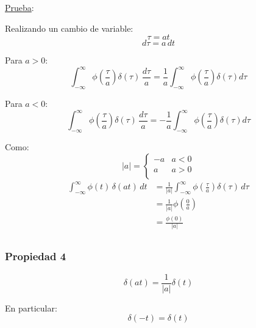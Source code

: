 \underline{Prueba}:

Realizando un cambio de variable:
\begin{equation*}
    \tau=at
\end{equation*}
\begin{equation*}
    d\tau=a\,dt
\end{equation*}

Para $a>0$:
\begin{equation*}
    \int_{-\infty}^{\infty}
        \phi\left(\frac{\tau}{a}\right)\delta(\tau)\,\frac{d\tau}{a}
        =\frac{1}{a}\int_{-\infty}^{\infty}
            \phi\left(\frac{\tau}{a}\right)\delta(\tau)d\tau
\end{equation*}

Para $a<0$:
\begin{equation*}
    \int_{-\infty}^{\infty}
        \phi\left(\frac{\tau}{a}\right)\delta(\tau)\,\frac{d\tau}{a}
        =-\frac{1}{a}\int_{-\infty}^{\infty}
            \phi\left(\frac{\tau}{a}\right)\delta(\tau)d\tau
\end{equation*}

Como:
\begin{equation*}
    |a|=\begin{cases}
        -a & a<0 \\
         a & a>0 \\
    \end{cases}
\end{equation*}
\begin{equation*}
\begin{split}
    \int_{-\infty}^{\infty}\phi(t)\,\delta(at)\,dt
        &=\frac{1}{|a|}\int_{-\infty}^{\infty}
            \phi\left(\frac{\tau}{a}\right)\delta(\tau)\,d\tau\\
        &=\frac{1}{|a|}\phi\left(\frac{0}{a}\right)\\
        &=\frac{\phi(0)}{|a|}\\
\end{split}
\end{equation*}

\subsubsection*{Propiedad 4}
\begin{equation}
    \delta(at)=\frac{1}{|a|}\delta(t)
\end{equation}

En particular:
\begin{equation}
    \delta(-t)=\delta(t)
\end{equation}

